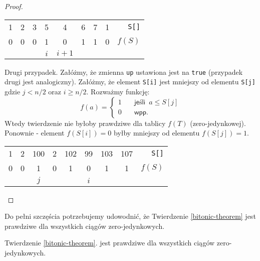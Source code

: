 \begin{proof}
  \begin{center}
  \begin{tabular}{ccccccccr}
  1 & 2 & 3 & 5          & 4            & 6 & 7 & 1 & \texttt{S[]} \\
  0 & 0 & 0 & 1          & 0            & 1 & 1 & 0 & $f(S)$ \\
    &   &   & $i$ & $i+1$ &   &   &   &
  \end{tabular}
  \end{center}
 
 Drugi przypadek.
 Załóżmy, że zmienna \texttt{up} ustawiona jest na \texttt{true} (przypadek drugi jest analogiczny).
 Załóżmy, że element \texttt{S[i]} jest mniejszy od elementu \texttt{S[j]} gdzie $j < n/2$ oraz $i \geq n/2$.
 Rozważmy funkcję:
  \[   
  f(a) = 
     \begin{cases}
       1 &\quad\textsf{jeśli} \enspace a \leq S[j]\\
       0 &\quad\textsf{wpp.}
     \end{cases}
 \]
 Wtedy twierdzenie nie byłoby prawdziwe dla tablicy $f(T)$ (zero-jedynkowej).
 Ponownie - element $f(S[i]) = 0$ byłby mniejszy od elementu $f(S[j]) = 1$.
 
  \begin{center}
  \begin{tabular}{ccccccccr}
  1 & 2 & 100        & 2 & 102 & 99         & 103 & 107 & \texttt{S[]} \\
  0 & 0 & 1          & 0 & 1   & 0          & 1   & 1   & $f(S)$ \\
    &   & $j$ &   &     & $i$ &     &     &
  \end{tabular}
  \end{center}
 
 
\end{proof}

Do pełni szczęścia potrzebujemy udowodnić, że Twierdzenie \ref{bitonic-theorem} jest prawdziwe dla wszystkich ciągów zero-jedynkowych.

\begin{lemma}
 Twierdzenie \ref{bitonic-theorem}. jest prawdziwe dla wszystkich ciągów zero-jedynkowych.
 \label{zero-one-cases-lemma}
\end{lemma}

